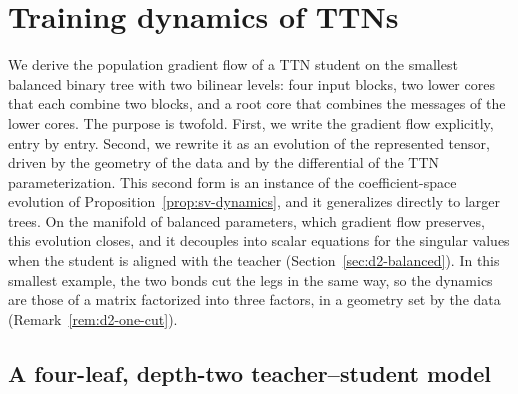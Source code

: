 \documentclass[11pt]{article}
\theoremstyle{definition}
\numberwithin{equation}{section}
\begin{document}
\section{Training dynamics of TTNs}\label{sec:ttn-dynamics}

We derive the population gradient flow of a TTN student on the smallest balanced binary tree with two bilinear levels: four input blocks, two lower cores that each combine two blocks, and a root core that combines the messages of the lower cores. The purpose is twofold. First, we write the gradient flow explicitly, entry by entry. Second, we rewrite it as an evolution of the represented tensor, driven by the geometry of the data and by the differential of the TTN parameterization. This second form is an instance of the coefficient-space evolution of Proposition~\ref{prop:sv-dynamics}, and it generalizes directly to larger trees. On the manifold of balanced parameters, which gradient flow preserves, this evolution closes, and it decouples into scalar equations for the singular values when the student is aligned with the teacher (Section~\ref{sec:d2-balanced}). In this smallest example, the two bonds cut the legs in the same way, so the dynamics are those of a matrix factorized into three factors, in a geometry set by the data (Remark~\ref{rem:d2-one-cut}).

\subsection{A four-leaf, depth-two teacher--student model}\label{sec:d2-setup}
\end{document}
